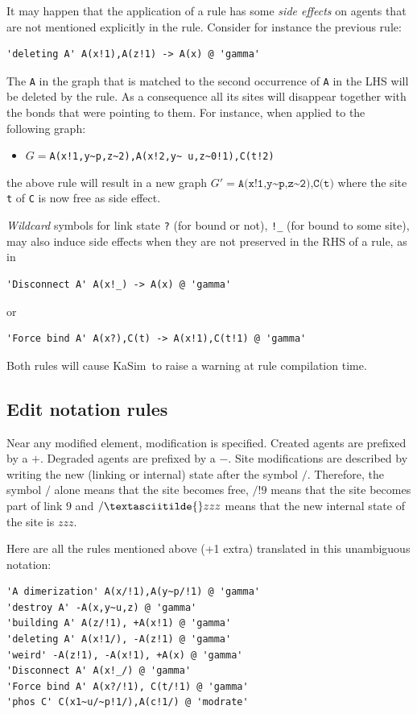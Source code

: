 \documentclass[11pt]{book}
\def\KaSim{\textsf{KaSim}}
\def\intstate{\textasciitilde}
\def\ttt#1{\texttt{#1}}
\def\ITE#1{\begin{itemize}#1\end{itemize}}
\begin{document}
It may happen that the application of a rule has some \emph{side
  effects} on agents that are not mentioned
explicitly in the rule. Consider for instance the previous rule:
\begin{lstlisting}[language=kappa]
'deleting A' A(x!1),A(z!1) -> A(x) @ 'gamma'
\end{lstlisting}
The \ttt{A} in the graph that is matched to the second occurrence of
\ttt{A} in the LHS will be deleted by the rule. As a consequence all
its sites will disappear together with the bonds that were pointing to
them. For instance, when applied to the following graph: \ITE{
\item[] $G=$\ttt{A(x!1,y\intstate p,z\intstate2),A(x!2,y\intstate
  u,z\intstate0!1),C(t!2)} } the above rule will result in a new graph
$G' =\ttt{A(x!1,y{\intstate}p,z\intstate2),C(t)}$ where the site
\ttt{t} of \ttt{C} is now free as side effect.

\emph{Wildcard} symbols for link state \ttt{?} (for bound or not),
\ttt{!\_} (for bound to some site), may also induce side effects when
they are not preserved in the RHS of a rule, as in
\begin{lstlisting}[language=kappa]
'Disconnect A' A(x!_) -> A(x) @ 'gamma'
\end{lstlisting}
or
\begin{lstlisting}[language=kappa]
'Force bind A' A(x?),C(t) -> A(x!1),C(t!1) @ 'gamma'
\end{lstlisting}
Both rules will cause \KaSim~to raise a warning at rule compilation time.

\subsection{Edit notation rules}

Near any modified element, modification is specified. Created agents
are prefixed by a $+$. Degraded agents are prefixed by a $-$. Site modifications are described by writing the new (linking or internal)
state after the symbol $/$. Therefore, the symbol $/$ alone means that the site becomes
free, $/!9$ means that the site becomes part of link $9$ and $/\intstate{}zzz$
means that the new internal state of the site is $zzz$.

Here are all the rules mentioned above (+1 extra) translated in this
unambiguous notation:
\begin{lstlisting}[language=kappa]
'A dimerization' A(x/!1),A(y~p/!1) @ 'gamma'
'destroy A' -A(x,y~u,z) @ 'gamma'
'building A' A(z/!1), +A(x!1) @ 'gamma'
'deleting A' A(x!1/), -A(z!1) @ 'gamma'
'weird' -A(z!1), -A(x!1), +A(x) @ 'gamma'
'Disconnect A' A(x!_/) @ 'gamma'
'Force bind A' A(x?/!1), C(t/!1) @ 'gamma'
'phos C' C(x1~u/~p!1/),A(c!1/) @ 'modrate'
\end{lstlisting}
\end{document}

